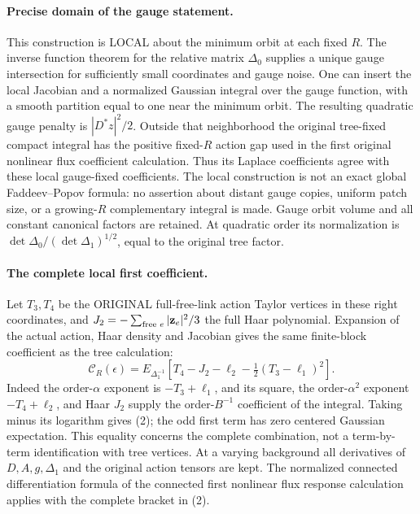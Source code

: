\documentclass[11pt]{article}
\begin{document}
\paragraph{Precise domain of the gauge statement.}
This construction is LOCAL about the minimum orbit at each fixed $R$.
The inverse function theorem for the relative matrix $\Delta_0$ supplies
a unique gauge intersection for sufficiently small coordinates and gauge
noise. One can insert the local Jacobian and a normalized Gaussian
integral over the gauge function, with a smooth partition equal to one
near the minimum orbit. The resulting quadratic gauge penalty is
$|D^*z|^2/2$. Outside that neighborhood the original tree-fixed compact
integral has the positive fixed-$R$ action gap used in the first original nonlinear flux coefficient calculation.
Thus its Laplace coefficients agree with these local gauge-fixed
coefficients. The local construction is not an exact global
Faddeev--Popov formula: no assertion about distant gauge copies,
uniform patch size, or a growing-$R$ complementary integral is made.
Gauge orbit volume and all constant canonical factors are retained.
At quadratic order its normalization is
$\det\Delta_0/(\det\Delta_1)^{1/2}$, equal to the original tree factor.

\paragraph{The complete local first coefficient.}
Let $T_3,T_4$ be the ORIGINAL full-free-link action Taylor vertices in
these right coordinates, and
$J_2=-\sum_{\text{free }e}|{\bf z}_e|^2/3$ the full Haar polynomial.
Expansion of the actual action, Haar density and Jacobian gives the
same finite-block coefficient as the tree calculation:
\[
 \boxed{\quad
 \mathcal C_R(\epsilon)=
 E_{\Delta_1^{-1}}\left[
 T_4-J_2-\ell_2-\tfrac12(T_3-\ell_1)^2\right].\quad}              \tag{2}
\]
Indeed the order-$\alpha$ exponent is $-T_3+\ell_1$, and its square,
the order-$\alpha^2$ exponent $-T_4+\ell_2$, and Haar $J_2$ supply the
order-$B^{-1}$ coefficient of the integral. Taking minus its logarithm
gives (2); the odd first term has zero centered Gaussian expectation.
This equality concerns the complete combination, not a term-by-term
identification with tree vertices. At a varying background all
derivatives of $D,A,g,\Delta_1$ and the original action tensors are kept.
The normalized connected differentiation formula of the connected first nonlinear flux response calculation applies
with the complete bracket in (2).
\end{document}
